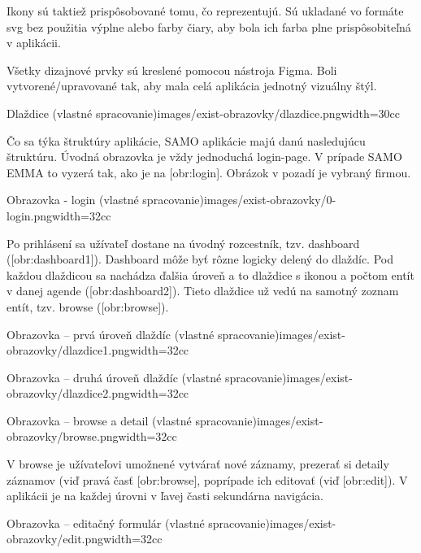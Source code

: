 Ikony sú taktiež prispôsobované tomu, čo reprezentujú. Sú ukladané vo formáte svg bez použitia výplne alebo farby čiary, aby bola ich farba plne prispôsobiteľná v aplikácii.

Všetky dizajnové prvky sú kreslené pomocou nástroja Figma. Boli vytvorené/upravované tak, aby mala celá aplikácia jednotný vizuálny štýl. 

{Dlaždice (vlastné spracovanie)}{images/exist-obrazovky/dlazdice.png}{width=30cc} 

Čo sa týka štruktúry aplikácie, SAMO aplikácie majú danú nasledujúcu štruktúru.  Úvodná obrazovka je vždy jednoduchá login-page. V prípade SAMO EMMA to vyzerá tak, ako je na [obr:login]. Obrázok v pozadí je vybraný firmou.

{Obrazovka - login (vlastné spracovanie)}{images/exist-obrazovky/0-login.png}{width=32cc} 

Po prihlásení sa užívateľ dostane na úvodný rozcestník, tzv. dashboard ([obr:dashboard1]). Dashboard môže byť rôzne logicky delený do dlaždíc. Pod každou dlaždicou sa nachádza ďalšia úroveň a to dlaždice s ikonou a počtom entít v danej agende ([obr:dashboard2]). Tieto dlaždice už vedú na samotný zoznam entít, tzv. browse ([obr:browse]).

{Obrazovka -- prvá úroveň dlaždíc (vlastné spracovanie)}{images/exist-obrazovky/dlazdice1.png}{width=32cc} 

{Obrazovka -- druhá úroveň dlaždíc (vlastné spracovanie)}{images/exist-obrazovky/dlazdice2.png}{width=32cc} 

{Obrazovka -- browse a detail (vlastné spracovanie)}{images/exist-obrazovky/browse.png}{width=32cc} 

V browse je užívateľovi umožnené vytvárať nové záznamy, prezerať si detaily záznamov (viď pravá časť [obr:browse], poprípade ich editovať (viď [obr:edit]). V aplikácii je na každej úrovni v ľavej časti sekundárna navigácia.

{Obrazovka -- editačný formulár (vlastné spracovanie)}{images/exist-obrazovky/edit.png}{width=32cc} 

